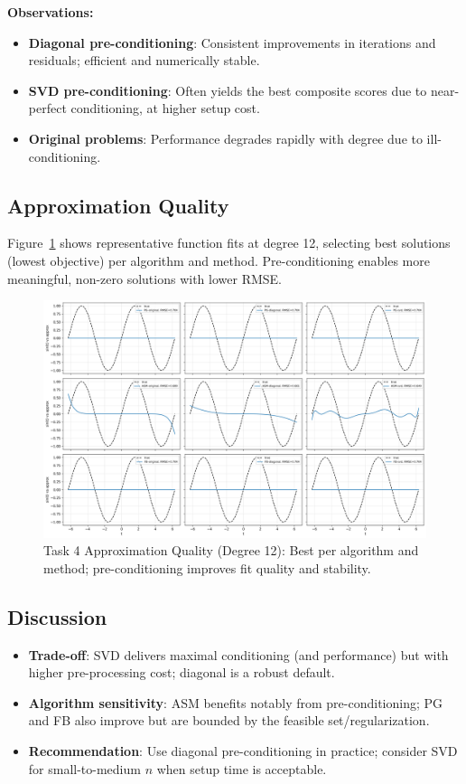 \documentclass[11pt,a4paper]{article}
\begin{document}
\textbf{Observations:}
\begin{itemize}
    \item \textbf{Diagonal pre-conditioning}: Consistent improvements in iterations and residuals; efficient and numerically stable.
    \item \textbf{SVD pre-conditioning}: Often yields the best composite scores due to near-perfect conditioning, at higher setup cost.
    \item \textbf{Original problems}: Performance degrades rapidly with degree due to ill-conditioning.
\end{itemize}

\subsection{Approximation Quality}

Figure~\ref{fig:task4_quality} shows representative function fits at degree 12, selecting best solutions (lowest objective) per algorithm and method. Pre-conditioning enables more meaningful, non-zero solutions with lower RMSE.

\begin{figure}[h]
\centering
\includegraphics[width=\textwidth]{../results/plots/task4_approximation_quality.png}
\caption{Task 4 Approximation Quality (Degree 12): Best per algorithm and method; pre-conditioning improves fit quality and stability.}
\label{fig:task4_quality}
\end{figure}

\subsection{Discussion}
\begin{itemize}
    \item \textbf{Trade-off}: SVD delivers maximal conditioning (and performance) but with higher pre-processing cost; diagonal is a robust default.
    \item \textbf{Algorithm sensitivity}: ASM benefits notably from pre-conditioning; PG and FB also improve but are bounded by the feasible set/regularization.
    \item \textbf{Recommendation}: Use diagonal pre-conditioning in practice; consider SVD for small-to-medium $n$ when setup time is acceptable.
\end{itemize}
\end{document}
